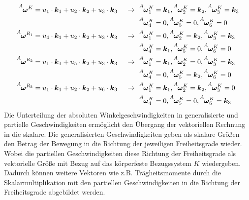 \begin{align}
\vel{A}{\omega}{K} &= u_1 \cdot \bs{k}_1 + u_2 \cdot \bs{k}_2 + u_3 \cdot \bs{k}_3 &\rArrow &\vel{A}{\omega}{K}_1 = \bs{k}_1, \vel{A}{\omega}{K}_2 = \bs{k}_2, \vel{A}{\omega}{K}_3 = \bs{k}_3 \\
& & &\vel{A}{\omega}{K}_4 = 0, \vel{A}{\omega}{K}_5 = 0, \vel{A}{\omega}{K}_6 = 0 
\\
\vel{A}{\omega}{R_1} &= u_4 \cdot \bs{k}_1 + u_2 \cdot \bs{k}_2 + u_3 \cdot \bs{k}_3 &\rArrow 
&\vel{A}{\omega}{K}_1 = 0, \vel{A}{\omega}{K}_2 = \bs{k}_2, \vel{A}{\omega}{K}_3 = \bs{k}_3 \\
& & &\vel{A}{\omega}{K}_4 = \bs{k}_1, \vel{A}{\omega}{K}_5 = 0, \vel{A}{\omega}{K}_6 = 0 
\\
\vel{A}{\omega}{R_2} &= u_1 \cdot \bs{k}_1 + u_5 \cdot \bs{k}_2 + u_3 \cdot \bs{k}_3&\rArrow 
&\vel{A}{\omega}{K}_1 = \bs{k}_1, \vel{A}{\omega}{K}_2 = 0, \vel{A}{\omega}{K}_3 = \bs{k}_3 \\
& & &\vel{A}{\omega}{K}_4 = 0, \vel{A}{\omega}{K}_5 = \bs{k}_2, \vel{A}{\omega}{K}_6 = 0 
\\
\vel{A}{\omega}{R_3} &= u_1 \cdot \bs{k}_1 + u_2 \cdot \bs{k}_2 + u_6 \cdot \bs{k}_3&\rArrow 
&\vel{A}{\omega}{K}_1 = \bs{k}_1, \vel{A}{\omega}{K}_2 = \bs{k}_2, \vel{A}{\omega}{K}_3 = 0 \\
& & &\vel{A}{\omega}{K}_4 = 0, \vel{A}{\omega}{K}_5 = 0, \vel{A}{\omega}{K}_6 = \bs{k}_3
\end{align}
Die Unterteilung der absoluten Winkelgeschwindigkeiten in generalisierte und partielle Geschwindigkeiten ermöglicht den Übergang der vektoriellen Rechnung in die skalare. Die generalisierten Geschwindigkeiten geben als skalare Größen den Betrag der Bewegung in die Richtung der jeweiligen Freiheitsgrade wieder. Wobei die partiellen Geschwindigkeiten diese Richtung der Freiheitsgrade als vektorielle Größe mit Bezug auf das körperfeste Bezugssystem $K$ wiedergeben. Dadurch können weitere Vektoren wie z.B. Trägheitsmomente durch die Skalarmultiplikation mit den partiellen Geschwindigkeiten in die Richtung der Freiheitsgrade abgebildet werden.

